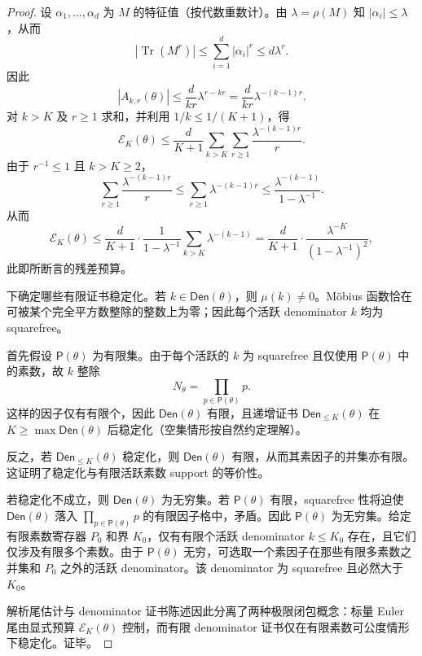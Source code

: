 \begin{proof}
设 \(\alpha_1,\ldots,\alpha_d\) 为 \(M\) 的特征值（按代数重数计）。由 \(\lambda=\rho(M)\) 知 \(|\alpha_i|\le\lambda\)，从而
\[
|\operatorname{Tr}(M^r)|\le\sum_{i=1}^d|\alpha_i|^r\le d\lambda^r.
\]
因此
\[
|A_{k,r}(\theta)|
\le \frac{d}{kr}\lambda^{r-kr}
=\frac{d}{kr}\lambda^{-(k-1)r}.
\]
对 \(k>K\) 及 \(r\ge1\) 求和，并利用 \(1/k\le1/(K+1)\)，得
\[
\mathcal E_K(\theta)\le
\frac{d}{K+1}\sum_{k>K}\sum_{r\ge1}\frac{\lambda^{-(k-1)r}}{r}.
\]
由于 \(r^{-1}\le1\) 且 \(k>K\ge2\)，
\[
\sum_{r\ge1}\frac{\lambda^{-(k-1)r}}{r}\le
\sum_{r\ge1}\lambda^{-(k-1)r}\le
\frac{\lambda^{-(k-1)}}{1-\lambda^{-1}}.
\]
从而
\[
\mathcal E_K(\theta)\le
\frac{d}{K+1}\cdot\frac1{1-\lambda^{-1}}
\sum_{k>K}\lambda^{-(k-1)}
=\frac{d}{K+1}\cdot\frac{\lambda^{-K}}{(1-\lambda^{-1})^2},
\]
此即所断言的残差预算。

下确定哪些有限证书稳定化。若 \(k\in\mathsf{Den}(\theta)\)，则 \(\mu(k)\ne0\)。Möbius 函数恰在可被某个完全平方数整除的整数上为零；因此每个活跃 denominator \(k\) 均为 squarefree。

首先假设 \(\mathsf P(\theta)\) 为有限集。由于每个活跃的 \(k\) 为 squarefree 且仅使用 \(\mathsf P(\theta)\) 中的素数，故 \(k\) 整除
\[
N_\theta=\prod_{p\in\mathsf P(\theta)}p.
\]
这样的因子仅有有限个，因此 \(\mathsf{Den}(\theta)\) 有限，且递增证书 \(\mathsf{Den}_{\le K}(\theta)\) 在 \(K\ge\max\mathsf{Den}(\theta)\) 后稳定化（空集情形按自然约定理解）。

反之，若 \(\mathsf{Den}_{\le K}(\theta)\) 稳定化，则 \(\mathsf{Den}(\theta)\) 有限，从而其素因子的并集亦有限。这证明了稳定化与有限活跃素数 support 的等价性。

若稳定化不成立，则 \(\mathsf{Den}(\theta)\) 为无穷集。若 \(\mathsf P(\theta)\) 有限，squarefree 性将迫使 \(\mathsf{Den}(\theta)\) 落入 \(\prod_{p\in\mathsf P(\theta)}p\) 的有限因子格中，矛盾。因此 \(\mathsf P(\theta)\) 为无穷集。给定有限素数寄存器 \(P_0\) 和界 \(K_0\)，仅有有限个活跃 denominator \(k\le K_0\) 存在，且它们仅涉及有限多个素数。由于 \(\mathsf P(\theta)\) 无穷，可选取一个素因子在那些有限多素数之并集和 \(P_0\) 之外的活跃 denominator。该 denominator 为 squarefree 且必然大于 \(K_0\)。

解析尾估计与 denominator 证书陈述因此分离了两种极限闭包概念：标量 Euler 尾由显式预算 \(\mathcal E_K(\theta)\) 控制，而有限 denominator 证书仅在有限素数可公度情形下稳定化。证毕。
\end{proof}

